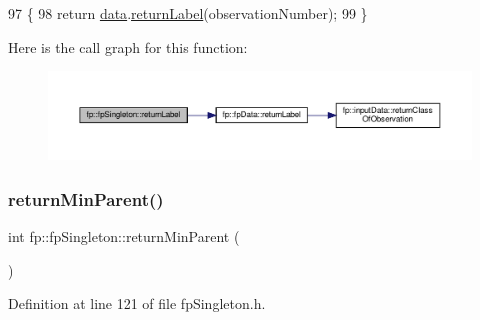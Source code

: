 \begin{DoxyCode}
97                                                          \{
98                 \textcolor{keywordflow}{return} \hyperlink{classfp_1_1fpSingleton_a2fa16ac6a0f66641749032eeee61b8e9}{data}.\hyperlink{classfp_1_1fpData_aac722f51424cb7f6ab7d89525f82cc72}{returnLabel}(observationNumber);
99             \}
\end{DoxyCode}
Here is the call graph for this function\+:
\nopagebreak
\begin{figure}[H]
\begin{center}
\leavevmode
\includegraphics[width=350pt]{classfp_1_1fpSingleton_aa2f644b1521948fb994f4087ddfaea14_cgraph}
\end{center}
\end{figure}
\mbox{\label{classfp_1_1fpSingleton_a2d06406b6462099e0adb393218090420}} 
\subsubsection{\texorpdfstring{return\+Min\+Parent()}{returnMinParent()}}
{\footnotesize\ttfamily int fp\+::fp\+Singleton\+::return\+Min\+Parent (\begin{DoxyParamCaption}{ }\end{DoxyParamCaption})\hspace{0.3cm}{\ttfamily [inline]}}



Definition at line 121 of file fp\+Singleton.\+h.


